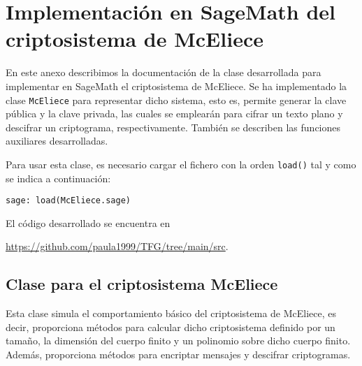 \chapter[Implementación en SageMath del criptosistema de McEliece]{Implementación en SageMath del criptosistema de McEliece}
\label{annex:sage-McEliece}

En este anexo describimos la documentación de la clase desarrollada para implementar en SageMath el criptosistema de McEliece. Se ha implementado la clase \texttt{McEliece} para representar dicho sistema, esto es, permite generar la clave pública y la clave privada, las cuales se emplearán para cifrar un texto plano y descifrar un criptograma, respectivamente. También se describen las funciones auxiliares desarrolladas. 

Para usar esta clase, es necesario cargar el fichero con la orden \texttt{load()} tal y como se indica a continuación:

\begin{lstlisting}[gobble=4]
    sage: load(McEliece.sage)
\end{lstlisting}

El código desarrollado se encuentra en
\begin{center}
\url{https://github.com/paula1999/TFG/tree/main/src}.
\end{center}

\section{Clase para el criptosistema McEliece}

Esta clase simula el comportamiento básico del criptosistema de McEliece, es decir, proporciona métodos para calcular dicho criptosistema definido por un tamaño, la dimensión del cuerpo finito y un polinomio sobre dicho cuerpo finito. Además, proporciona métodos para encriptar mensajes y descifrar criptogramas.


